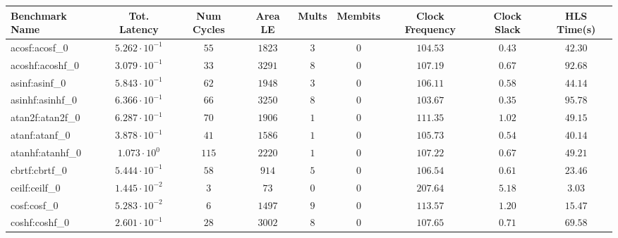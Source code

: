 \begin{tabular}{|l|c|c|c|c|c|c|c|c|}
\hline
Benchmark Name               & Tot. Latency            & Num Cycles & Area LE   & Mults   & Membits    & Clock Frequency & Clock Slack & HLS Time(s) \\
\hline
acosf:acosf\_0               & $ 5.262 \cdot 10^{-1} $ & $ 55     $ & $ 1823  $ & $ 3   $ & $ 0      $ & $ 104.53      $ & $ 0.43    $ & $ 42.30   $ \\
acoshf:acoshf\_0             & $ 3.079 \cdot 10^{-1} $ & $ 33     $ & $ 3291  $ & $ 8   $ & $ 0      $ & $ 107.19      $ & $ 0.67    $ & $ 92.68   $ \\
asinf:asinf\_0               & $ 5.843 \cdot 10^{-1} $ & $ 62     $ & $ 1948  $ & $ 3   $ & $ 0      $ & $ 106.11      $ & $ 0.58    $ & $ 44.14   $ \\
asinhf:asinhf\_0             & $ 6.366 \cdot 10^{-1} $ & $ 66     $ & $ 3250  $ & $ 8   $ & $ 0      $ & $ 103.67      $ & $ 0.35    $ & $ 95.78   $ \\
atan2f:atan2f\_0             & $ 6.287 \cdot 10^{-1} $ & $ 70     $ & $ 1906  $ & $ 1   $ & $ 0      $ & $ 111.35      $ & $ 1.02    $ & $ 49.15   $ \\
atanf:atanf\_0               & $ 3.878 \cdot 10^{-1} $ & $ 41     $ & $ 1586  $ & $ 1   $ & $ 0      $ & $ 105.73      $ & $ 0.54    $ & $ 40.14   $ \\
atanhf:atanhf\_0             & $ 1.073 \cdot 10^{0}  $ & $ 115    $ & $ 2220  $ & $ 1   $ & $ 0      $ & $ 107.22      $ & $ 0.67    $ & $ 49.21   $ \\
cbrtf:cbrtf\_0               & $ 5.444 \cdot 10^{-1} $ & $ 58     $ & $ 914   $ & $ 5   $ & $ 0      $ & $ 106.54      $ & $ 0.61    $ & $ 23.46   $ \\
ceilf:ceilf\_0               & $ 1.445 \cdot 10^{-2} $ & $ 3      $ & $ 73    $ & $ 0   $ & $ 0      $ & $ 207.64      $ & $ 5.18    $ & $ 3.03    $ \\
cosf:cosf\_0                 & $ 5.283 \cdot 10^{-2} $ & $ 6      $ & $ 1497  $ & $ 9   $ & $ 0      $ & $ 113.57      $ & $ 1.20    $ & $ 15.47   $ \\
coshf:coshf\_0               & $ 2.601 \cdot 10^{-1} $ & $ 28     $ & $ 3002  $ & $ 8   $ & $ 0      $ & $ 107.65      $ & $ 0.71    $ & $ 69.58   $ \\

\end{tabular}
